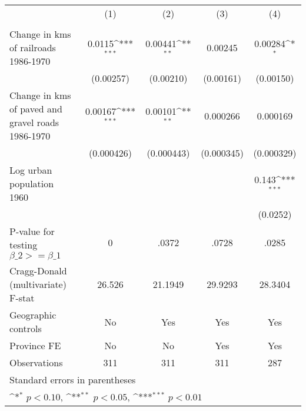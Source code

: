 {
\def\sym#1{\ifmmode^{#1}\else\(^{#1}\)\fi}
\begin{tabular}{l*{4}{c}}
\hline\hline
                &\multicolumn{1}{c}{(1)}&\multicolumn{1}{c}{(2)}&\multicolumn{1}{c}{(3)}&\multicolumn{1}{c}{(4)}\\
                &\multicolumn{1}{c}{}&\multicolumn{1}{c}{}&\multicolumn{1}{c}{}&\multicolumn{1}{c}{}\\
\hline
Change in kms of railroads 1986-1970&   0.0115\sym{***}&  0.00441\sym{**} &  0.00245         &  0.00284\sym{*}  \\
                &(0.00257)         &(0.00210)         &(0.00161)         &(0.00150)         \\
[1em]
Change in kms of paved and gravel roads 1986-1970&  0.00167\sym{***}&  0.00101\sym{**} & 0.000266         & 0.000169         \\
                &(0.000426)         &(0.000443)         &(0.000345)         &(0.000329)         \\
[1em]
Log urban population 1960&                  &                  &                  &    0.143\sym{***}\\
                &                  &                  &                  & (0.0252)         \\
\hline
P-value for testing $\beta\_{2} >= \beta\_{1}$&        0         &    .0372         &    .0728         &    .0285         \\
Cragg-Donald (multivariate) F-stat&   26.526         &  21.1949         &  29.9293         &  28.3404         \\
Geographic controls&       No         &      Yes         &      Yes         &      Yes         \\
Province FE     &       No         &       No         &      Yes         &      Yes         \\
Observations    &      311         &      311         &      311         &      287         \\
\hline\hline
\multicolumn{5}{l}{\footnotesize Standard errors in parentheses}\\
\multicolumn{5}{l}{\footnotesize \sym{*} \(p<0.10\), \sym{**} \(p<0.05\), \sym{***} \(p<0.01\)}\\
\end{tabular}
}
